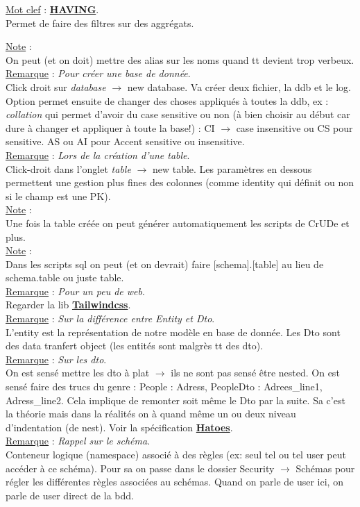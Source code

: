 \documentclass[a4paper,12pt,twoside]{article}
\newcommand{\urlcolor}{magenta}  %
\newcommand{\keycolor}{purple} %
\newcommand{\rem}[2]{\noindent\underline{Remarque} : \textit{#1}.\\ \indent #2}
\newcommand{\note}[1]{\noindent\underline{Note} : \\ \indent #1}
\newcommand{\keyref}[2]{\hypersetup{urlcolor=\keycolor} \href{#1}{\textbf{#2}}\hypersetup{urlcolor=\urlcolor}}
\newcommand{\keyword}[3]{\noindent\underline{Mot clef} : \keyref{#1}{#2}. \\ \indent #3}
\begin{document}
\keyword{https://sql.sh/cours/having}{HAVING}{Permet de faire des filtres sur des aggrégats.}

\note{On peut (et on doit) mettre des alias sur les noms quand tt devient trop verbeux.}\\

\rem{Pour créer une base de donnée}{Click droit sur \textit{database} $\to$ {new database}. Va créer deux fichier, la ddb et le log. Option permet ensuite de changer des choses appliqués à toutes la ddb, ex : \textit{collation} qui permet d'avoir du case sensitive ou non (à bien choisir au début car dure à changer et appliquer à toute la base!) : CI $\to$ case insensitive ou CS pour sensitive. AS ou AI pour Accent sensitive ou insensitive.}\\

\rem{Lors de la création d'une table}{Click-droit dans l'onglet \textit{table} $\to$ {new table}. Les paramètres en dessous permettent une gestion plus fines des colonnes (comme identity qui définit ou non si le champ est une PK).}\\

\note{Une fois la table créée on peut générer automatiquement les scripts de CrUDe et plus. }\\

\note{Dans les scripts sql on peut (et on devrait) faire [schema].[table] au lieu de schema.table ou juste table.}\\

\rem{Pour un peu de web}{Regarder la lib \keyref{https://tailwindcss.com/}{Tailwindcss}.}\\

\rem{Sur la différence entre Entity et Dto}{L'entity est la représentation de notre modèle en base de donnée. Les Dto sont des data tranfert object (les entités sont malgrès tt des dto).}\\

\rem{Sur les dto}{On est sensé mettre les dto à plat $\to$ ils ne sont pas sensé être nested. On est sensé faire des trucs du genre : People : Adress, PeopleDto : Adrees_line1, Adress_line2. Cela implique de remonter soit même le Dto par la suite. Sa c'est la théorie mais dans la réalités on à quand même un ou deux niveau d'indentation (de nest). Voir la spécification \keyref{https://en.wikipedia.org/wiki/HATEOAS}{Hatoes}.}\\

\rem{Rappel sur le schéma}{Conteneur logique (namespace) associé à des règles (ex: seul tel ou tel user peut accéder à ce schéma). Pour sa on passe dans le dossier Security $\to$ Schémas pour régler les différentes règles associées au schémas. Quand on parle de user ici, on parle de user direct de la bdd.}\\
\end{document}
